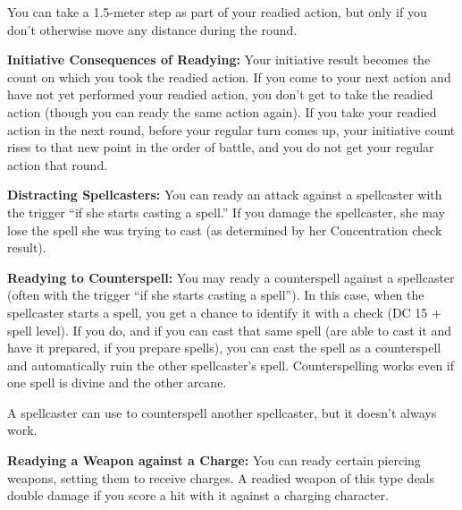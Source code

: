 You can take a 1.5-meter step as part of your readied action, but only if you don't otherwise move any distance during the round.

\textbf{Initiative Consequences of Readying:} Your initiative result becomes the count on which you took the readied action. If you come to your next action and have not yet performed your readied action, you don't get to take the readied action (though you can ready the same action again). If you take your readied action in the next round, before your regular turn comes up, your initiative count rises to that new point in the order of battle, and you do not get your regular action that round.

\textbf{Distracting Spellcasters:} You can ready an attack against a spellcaster with the trigger ``if she starts casting a spell.'' If you damage the spellcaster, she may lose the spell she was trying to cast (as determined by her Concentration check result).

\textbf{Readying to Counterspell:} You may ready a counterspell against a spellcaster (often with the trigger ``if she starts casting a spell''). In this case, when the spellcaster starts a spell, you get a chance to identify it with a  check (DC 15 + spell level). If you do, and if you can cast that same spell (are able to cast it and have it prepared, if you prepare spells), you can cast the spell as a counterspell and automatically ruin the other spellcaster's spell. Counterspelling works even if one spell is divine and the other arcane.

A spellcaster can use  to counterspell another spellcaster, but it doesn't always work.

\textbf{Readying a Weapon against a Charge:} You can ready certain piercing weapons, setting them to receive charges. A readied weapon of this type deals double damage if you score a hit with it against a charging character.
